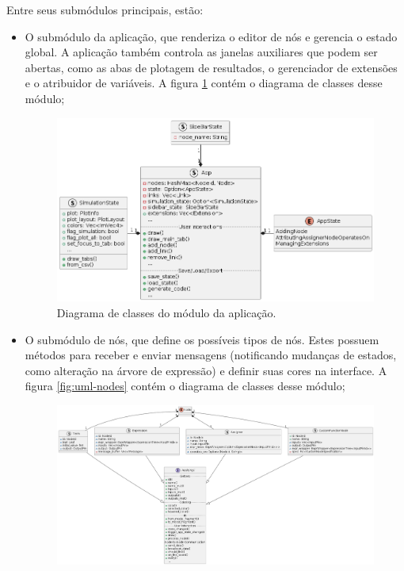 \documentclass[
	12pt,				%
	openright,			%
	oneside,			%
	a4paper,			%
	main=brazil,
	english,			%
	]{ufsj-abntex2}
\begin{document}
Entre seus submódulos principais, estão:

\begin{itemize}
    \item O submódulo da aplicação, que renderiza o editor de nós e gerencia o estado global. A aplicação também controla as janelas auxiliares que podem ser abertas, como as abas de plotagem de resultados, o gerenciador de extensões e o atribuidor de variáveis. A figura \ref{fig:uml-app} contém o diagrama de classes desse módulo;
    \begin{figure}[h]
        \centering
        \includegraphics[scale=0.5]{diagrams/img/app.png} 
        \caption{Diagrama de classes do módulo da aplicação.}
        \label{fig:uml-app}
    \end{figure}
    \item O submódulo de nós, que define os possíveis tipos de nós. Estes possuem métodos para receber e enviar mensagens (notificando mudanças de estados, como alteração na árvore de expressão) e definir suas cores na interface. A figura \ref{fig:uml-nodes} contém o diagrama de classes desse módulo;
    \begin{figure}[h]
        \centering
        \includegraphics[scale=0.3]{diagrams/img/nodes.png} 

\end{figure}
\end{itemize}
\end{document}
